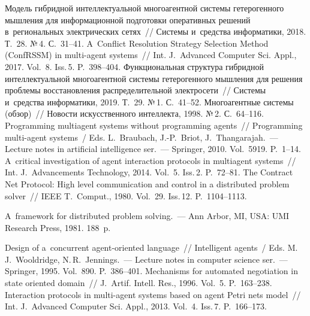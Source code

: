 \begin{multicols}{2}
{{\begin{thebibliography}{99}
   Модель гибридной интеллектуальной 
многоагентной системы гетерогенного мышления для информационной подготовки 
оперативных решений в~региональных электрических сетях~// Системы и~средства 
информатики, 2018. Т.~28. №\,4. С.~31--41.
  A~Conflict Resolution Strategy Selection Method (ConfRSSM) 
in multi-agent systems~// Int. J.~Advanced Computer Sci. Appl., 
2017. Vol.~8. Iss.\,5. P.~398--404.
   Функциональная структура гибридной 
интеллектуальной многоагентной системы гетерогенного мышления для решения проблемы 
восстановления распределительной электросети~// Системы и~средства информатики, 2019. 
Т.~29. №\,1. С.~41--52.
  Многоагентные системы (обзор)~// 
Новости искусственного интеллекта, 1998. №\,2. С.~64--116.
  Programming multiagent systems without programming agents~// 
Programming multi-agent systems~/ Eds. L.~Braubach, J.-P.~Briot, J.~Thangarajah.~--- 
  Lecture notes in artificial intelligence ser.~--- Springer, 2010.   Vol.~5919. P.~1--14. 
  A~critical investigation of agent interaction protocols in 
multiagent systems~// Int. J.~Advancements Technology, 2014. Vol.~5. Iss.\,2. 
P.~72--81.
   The Contract Net Protocol: High level communication and control in a 
distributed problem solver~// IEEE T.~Comput., 1980. Vol.~29. Iss.\,12.  
P.~1104--1113.

   A~framework for distributed problem solving.~--- Ann Arbor, MI,
  USA: UMI  Research Press, 1981. 188~p.

  Design of a~concurrent agent-oriented 
language~// Intelligent agents~/ Eds. M.\,J.~Wooldridge, N.\,R.~Jennings.~---
Lecture notes in computer science ser.~---  Springer, 1995.  
Vol.~890. P.~386--401.
   Mechanisms for automated negotiation in state oriented 
domain~// J.~Artif. Intell. Res., 1996. Vol.~5. P.~163--238.
  Interaction protocols in multi-agent systems based on agent 
Petri nets model~// Int. J.~Advanced Computer Sci. Appl., 2013. 
Vol.~4. Iss.\,7. P.~166--173. 

 \end{thebibliography}

 }
 }

\end{multicols}

